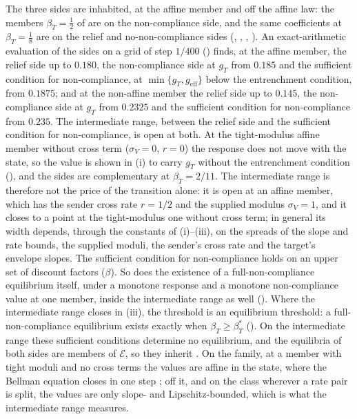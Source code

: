 The three sides are inhabited, at the affine member and off the affine law:
the members $\beta_T=\tfrac12$ of  are on the non-compliance
side, and the same coefficients at $\beta_T=\tfrac18$ are on the relief and
no-non-compliance sides (,
, ,
). An exact-arithmetic evaluation of
the sides on a grid of step $1/400$
() finds, at
the affine member, the relief side up to $0.180$, the non-compliance side at $g_T$
from $0.185$ and the sufficient condition for non-compliance, at $\min\{g_T,g_{\mathrm{eff}}\}$ below the
entrenchment condition, from $0.1875$; and at the non-affine member the relief side up to
$0.145$, the non-compliance side at $g_T$ from $0.2325$ and the sufficient condition for non-compliance from
$0.235$. The intermediate range, between the relief side and the sufficient condition for
non-compliance, is open at
both. At the tight-modulus affine member without cross term ($\sigma_V=0$, $r=0$) the
response does not move with the state, so the value is shown in (i) to carry $g_T$
without the entrenchment condition
(), and the sides are complementary at
$\beta_T=2/11$. The intermediate range is therefore not the price of the transition alone:
it is open at an affine member, which has the sender cross rate $r=1/2$ and the
supplied modulus $\sigma_V=1$, and it closes to a point at the tight-modulus
one without cross term; in general its width depends, through the constants of
(i)--(iii), on the spreads of the slope and rate bounds, the supplied moduli,
the sender's cross rate and the target's envelope slopes. The sufficient condition for non-compliance holds on
an upper set of discount factors ($\beta$).
So does the existence of a full-non-compliance equilibrium itself, under a monotone
response and a monotone non-compliance value at one member, inside the intermediate range as well
(). Where the intermediate range closes in (iii), the threshold is an
equilibrium threshold: a full-non-compliance equilibrium exists exactly when
$\beta_T\ge\beta_T^*$ ().
On the intermediate range these
sufficient conditions determine no equilibrium, and the equilibria of both sides are members of
$\mathcal E$, so they inherit . On the family, at
a member with tight moduli and no cross terms the values are affine in the state,
where the Bellman equation closes in one step \citep{Puterman1994}; off
it, and on the class wherever a rate pair is split, the values are only slope-
and Lipschitz-bounded, which is what the intermediate range
measures.

